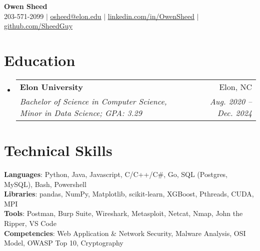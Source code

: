\documentclass[letterpaper,11pt]{article}
\makeatletter
\newcommand{\resumeSubheading}[4]{
  \vspace{-2pt}\item
    \begin{tabular*}{0.97\textwidth}[t]{l@{\extracolsep{\fill}}r}
      \textbf{#1} & #2 \\
      \textit{\small#3} & \textit{\small #4} \\
    \end{tabular*}\vspace{-7pt}
}
\newcommand{\resumeSubHeadingListStart}{\begin{itemize}[leftmargin=0.15in, label={}]}
\newcommand{\resumeSubHeadingListEnd}{\end{itemize}}
\makeatother
\begin{document}
\begin{center}
  \textbf{\Huge Owen Sheed} \\ \vspace{1pt}
  \small 203-571-2099 $|$
  \href{mailto:osheed@elon.edu}{\uline{osheed@elon.edu}} $|$ 
  \href{https://www.linkedin.com/in/owensheed/}{\uline{linkedin.com/in/OwenSheed}} $|$
  \href{https://github.com/SheedGuy}{\uline{github.com/SheedGuy}}
\end{center}


\section{Education}
  \resumeSubHeadingListStart
    \resumeSubheading
      {Elon University}{Elon, NC}
      {Bachelor of Science in Computer Science, Minor in Data Science; GPA: 3.29}{Aug. 2020 -- Dec. 2024}
  \resumeSubHeadingListEnd


\section{Technical Skills}
 \begin{itemize}[leftmargin=0.15in, label={}]
    \small{\item{
     \textbf{Languages}{: Python, Java, Javascript, C/C++/C\#, Go, SQL (Postgres, MySQL), Bash, Powershell} \\
     \textbf{Libraries}{: pandas, NumPy, Matplotlib, scikit-learn, XGBoost, Pthreads, CUDA, MPI} \\
     \textbf{Tools}{: Postman, Burp Suite, Wireshark, Metasploit, Netcat, Nmap, John the Ripper, VS Code} \\
     \textbf{Competencies}{: Web Application \& Network Security, Malware Analysis, OSI Model, OWASP Top 10, Cryptography}
    }}
 \end{itemize}
\end{document}
